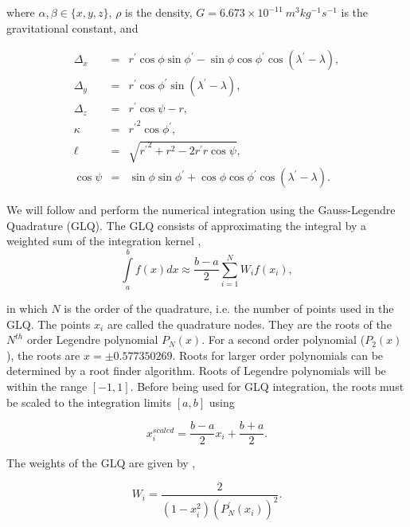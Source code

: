 \documentclass[paper,twocolumn]{geophysics}
\begin{document}
\noindent
where $\alpha, \beta \in \{x, y, z\}$,
$\rho$ is the density,
$G = 6.673\times10^{-11}\ m^3kg^{-1}s^{-1}$ is the gravitational constant,
and

\begin{eqnarray}
    \Delta_x &=& r^\prime\cos\phi\sin\phi^\prime - \sin\phi\cos\phi^\prime
                 \cos(\lambda^\prime - \lambda), \\
    \Delta_y &=& r^\prime \cos \phi^\prime \sin(\lambda^\prime - \lambda), \\
    \Delta_z &=& r^\prime \cos \psi - r,\\
    \kappa &=& {r^\prime}^2 \cos \phi^\prime, \\
    \ell &=& \sqrt{{r^\prime}^2 + r^2 - 2 r^\prime r \cos \psi}, \\
    \cos\psi &=& \sin\phi\sin\phi^\prime + \cos\phi\cos\phi^\prime
                 \cos(\lambda^\prime - \lambda).
\end{eqnarray}

We will follow \citet{Asgharzadeh2007} and perform the numerical integration
using the Gauss-Legendre Quadrature (GLQ).
The GLQ consists of approximating the integral by a weighted sum of the
integration kernel \citep{Hildebrand1987},
\begin{equation}
    \int\limits_a^b f(x) dx \approx
    \frac{b-a}{2}\sum\limits_{i=1}^N W_i f(x_i),
    \label{eq:glq1d}
\end{equation}

\noindent
in which $N$ is the order of the quadrature,
i.e. the number of points used in the GLQ.
The points $x_i$ are called the quadrature nodes.
They are the roots of the $N^{th}$ order Legendre polynomial $P_N(x)$.
For a second order polynomial ($P_2(x)$),
the roots are $x = \pm 0.577350269$.
Roots for larger order polynomials
can be determined by a root finder algorithm.
Roots of Legendre polynomials
will be within the range $[-1, 1]$.
Before being used for GLQ integration,
the roots must be scaled to the integration limits $[a, b]$ using

\begin{equation}
    x^{scaled}_i = \frac{b - a}{2} x_i + \frac{b + a}{2}.
    \label{eq:glq_scaling}
\end{equation}

The weights of the GLQ are given by \citep{Hildebrand1987},

\begin{equation}
    W_i = \frac{2}{(1 - x_i^2)(P^\prime_N(x_i))^2}.
    \label{eq:glq_weights}
\end{equation}
\end{document}
